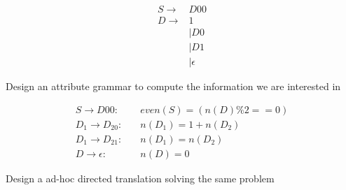 \documentclass[11pt]{article}
\begin{document}

\maketitle %

\thispagestyle{empty} %

\newpage


\begin{question}



\begin{align*}
S \rightarrow& D00\\
D \rightarrow& 1\\      
  &| D0\\
  &| D1\\
  &| \epsilon
\end{align*}              

\begin{subquestion}{Design an attribute grammar to compute the information we are
interested in}

\begin{align*}
S\rightarrow D00:&\quad even(S) = (n(D)\%2 == 0)\\
D_1\rightarrow D_20:&\quad n(D_1) = 1 + n(D_2)\\
D_1\rightarrow D_21:&\quad n(D_1) = n(D_2)\\
D\rightarrow \epsilon:&\quad n(D) = 0
\end{align*}  

\end{subquestion}

\begin{subquestion}{Design a ad-hoc directed translation solving the same problem} 


\end{subquestion}
\end{question}
\end{document}

